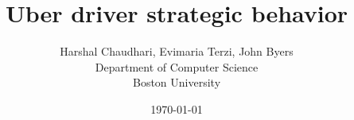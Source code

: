 \documentclass[11pt]{article}
\title{Uber driver strategic behavior}
\author{
  Harshal Chaudhari, Evimaria Terzi, John Byers \\
  Department of Computer Science\\
  Boston University
}
\date{\today}
\begin{document}
\maketitle	




\onehalfspacing





\end{document}
